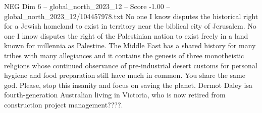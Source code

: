 \begin{textsample}{NEG Dim 6 – global\_north\_2023\_12 – Score -1.00 – global\_north\_2023\_12/104457978.txt}
No one I know disputes the historical right for a Jewish homeland to exist in territory near the biblical city of Jerusalem.
No one I know disputes the right of the Palestinian nation to exist freely in a land known for millennia as Palestine.
The Middle East has a shared history for many tribes with many allegiances and it contains the genesis of three monotheistic religions whose continued observance of pre-industrial desert customs for personal hygiene and food preparation still have much in common.
You share the same god.
Please, stop this insanity and focus on saving the planet.
Dermot Daley isa fourth-generation Australian living in Victoria, who is now retired from construction project management????.

\end{textsample}
